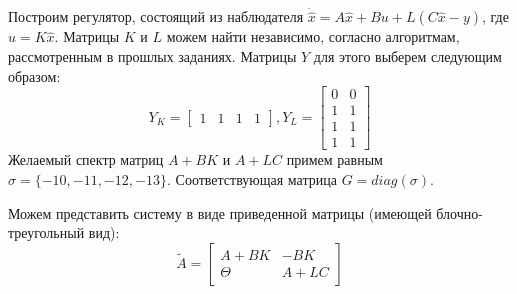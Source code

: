 Построим регулятор, состоящий из наблюдателя $\dot{\hat x} = A\hat x + Bu + L(C\hat x - y)$,
где $u = K\hat x$. Матрицы $K$ и $L$ можем найти независимо, согласно алгоритмам, рассмотренным
в прошлых заданиях. Матрицы $Y$ для этого выберем следующим образом:
\begin{equation*}
    Y_K = \begin{bmatrix}
        1 & 1 & 1 & 1
    \end{bmatrix},
    Y_L = \begin{bmatrix}
        0 & 0 \\
        1 & 1 \\
        1 & 1 \\
        1 & 1
    \end{bmatrix}
\end{equation*}
Желаемый спектр матриц $A + BK$ и $A + LC$ примем равным $\sigma=\{-10,-11,-12,-13\}$.
Соответствующая матрица $G=diag(\sigma)$.

Можем представить систему в виде приведенной матрицы (имеющей блочно-треугольный вид):
\begin{equation}
    \tilde{A} = \begin{bmatrix}
        A + BK & -BK \\
        \Theta & A + LC
    \end{bmatrix}
\end{equation}
\pagebreak

